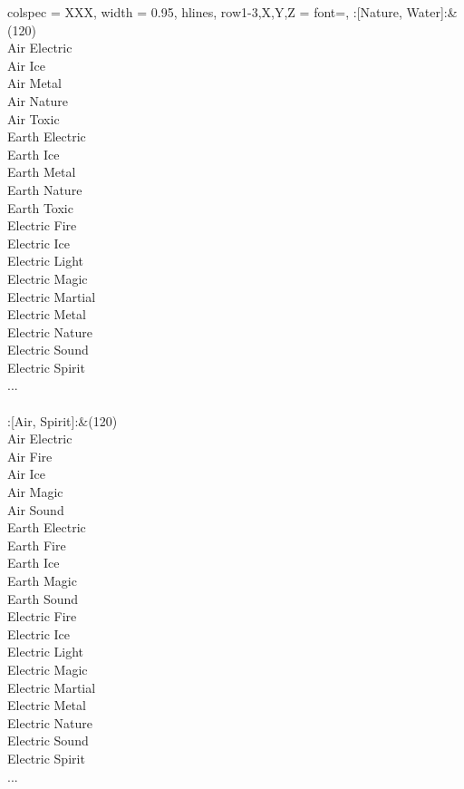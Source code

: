\begin{longtblr}[
	caption = {2v2 Defending Weak},
	label = {2v2-Defending-Weak},
]{
	colspec = {XXX}, width = 0.95\linewidth,
	hlines,
	row{1-3,X,Y,Z} = {font=\bfseries},
}
	:[Nature, Water]:&{(120)\\
	Air Electric \\
	Air Ice \\
	Air Metal \\
	Air Nature \\
	Air Toxic \\
	Earth Electric \\
	Earth Ice \\
	Earth Metal \\
	Earth Nature \\
	Earth Toxic \\
	Electric Fire \\
	Electric Ice \\
	Electric Light \\
	Electric Magic \\
	Electric Martial \\
	Electric Metal \\
	Electric Nature \\
	Electric Sound \\
	Electric Spirit \\
	...\\
	}\\

	:[Air, Spirit]:&{(120)\\
	Air Electric \\
	Air Fire \\
	Air Ice \\
	Air Magic \\
	Air Sound \\
	Earth Electric \\
	Earth Fire \\
	Earth Ice \\
	Earth Magic \\
	Earth Sound \\
	Electric Fire \\
	Electric Ice \\
	Electric Light \\
	Electric Magic \\
	Electric Martial \\
	Electric Metal \\
	Electric Nature \\
	Electric Sound \\
	Electric Spirit \\
	...\\
	}\\


\end{longtblr}
